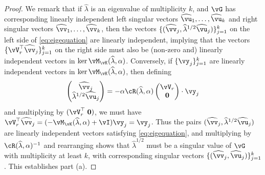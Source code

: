 \begin{proof}
We remark
that if $\widehat\lambda$ is
an eigenvalue of multiplicity $k$, and $\vG$ has corresponding linearly
independent left singular vectors $\widehat\vu_1,\ldots,\widehat\vu_k$
and right singular vectors $\widehat\vv_1,\ldots,\widehat\vv_k$, then the
vectors $\{(\widehat \vv_j,\widehat\lambda^{1/2}\widehat \vu_j)\}_{j=1}^k$ on the left side
of \eqref{eq:eigequation} are linearly independent, implying that the vectors
$\{\vV_r^\top \widehat\vv_j\}_{j=1}^k$ on the right side must also be
(non-zero and) linearly independent vectors in $\ker \vM_{\vK}(\widehat\lambda,\alpha)$.
Conversely, if $\{\vy_j\}_{j=1}^k$ are linearly independent vectors in
$\ker \vM_{\vK}(\widehat\lambda,\alpha)$, then defining
\[\begin{pmatrix} \widehat\vv_j \\ \widehat\lambda^{1/2}\widehat \vu_j \end{pmatrix}
=-\alpha \vcR(\widehat\lambda,\alpha)\begin{pmatrix} \vV_r \\ \mathbf{0} \end{pmatrix}
\cdot \vy_j\]
and multiplying by $(\vV_r^\top\; \mathbf{0})$, we must have
$\vV_r^\top \widehat \vv_j=({-}\vM_{\vK}(\widehat\lambda,\alpha)+\vI)\vy_j=\vy_j$. Thus the
pairs $(\widehat\vv_j,\widehat\lambda^{1/2}\widehat\vu_j)$ are linearly independent vectors
satisfying \eqref{eq:eigequation}, and multiplying by
$\vcR(\widehat\lambda,\alpha)^{-1}$ and rearranging shows that
$\widehat\lambda^{1/2}$ must be a singular
value of $\vG$ with multiplicity at least $k$, with corresponding
singular vectors $\{(\widehat\vv_j,\widehat\vu_j)\}_{j=1}^k$.
This establishes part (a).


\end{proof}
